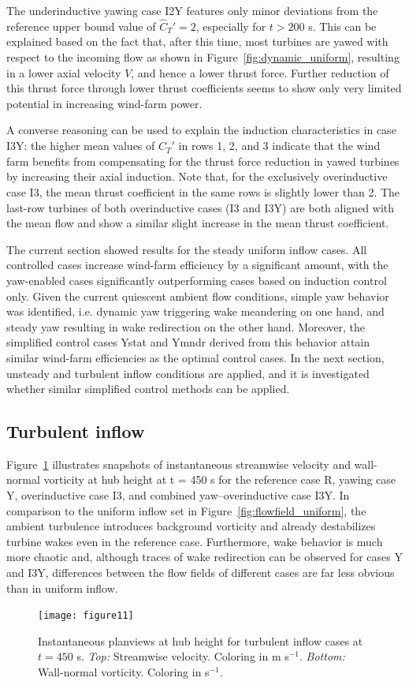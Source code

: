 \documentclass[energies,article,submit,moreauthors,latex,10pt,a4paper]{mdpi}
\newcommand{\cthat}{\widehat{C}_T'}
\begin{document}
The underinductive yawing case I2Y features only minor deviations from the reference upper bound value of $\cthat = 2$, especially for $t > 200$ s. This can be explained based on the fact that, after this time, most turbines are yawed with respect to the incoming flow as shown in Figure~\ref{fig:dynamic_uniform}, resulting in a lower axial velocity $V$, and hence a lower thrust force. Further reduction of this thrust force through lower thrust coefficients seems to show only very limited potential in increasing wind-farm power. 

A converse reasoning can be used to explain the induction characteristics in case I3Y: the higher mean values of $\cthat$ in rows 1, 2, and 3 indicate that the wind farm benefits from compensating for the thrust force reduction in yawed turbines by increasing their axial induction. Note that, for the exclusively overinductive case I3, the mean thrust coefficient in the same rows is slightly lower than 2. The last-row turbines of both overinductive cases (I3 and I3Y) are both aligned with the mean flow and show a similar slight increase in the mean thrust coefficient. 

The current section showed results for the steady uniform inflow cases. All controlled cases increase wind-farm efficiency by a significant amount, with the yaw-enabled cases significantly outperforming cases based on induction control only. Given the current quiescent ambient flow conditions, simple yaw behavior was identified, i.e. dynamic yaw triggering wake meandering on one hand, and steady yaw resulting in wake redirection on the other hand. Moreover, the simplified control cases Ystat and Ymndr derived from this behavior attain similar wind-farm efficiencies as the optimal control cases. In the next section, unsteady and turbulent inflow conditions are applied, and it is investigated whether similar simplified control methods can be applied.

\subsection{Turbulent inflow}\label{sec:opt_yaw_turb}
\noindent Figure~\ref{fig:flowfield_turb} illustrates snapshots of instantaneous streamwise velocity and wall-normal vorticity at hub height at t = 450 s for the reference case R, yawing case Y, overinductive case I3, and combined yaw--overinductive case I3Y. In comparison to the uniform inflow set in Figure~\ref{fig:flowfield_uniform}, the ambient turbulence introduces background vorticity and already destabilizes turbine wakes even in the reference case. Furthermore, wake behavior is much more chaotic and, although traces of wake redirection can be observed for cases Y and I3Y, differences between the flow fields of different cases are far less obvious than in uniform inflow. 
\begin{figure}
	\texttt{[image: figure11]}
	\caption{Instantaneous planviews at hub height for turbulent inflow cases at $t= 450$ s. \emph{Top: } Streamwise velocity. Coloring in m s$^{-1}$. \emph{Bottom: } Wall-normal vorticity. Coloring in s$^{-1}$. \label{fig:flowfield_turb}}
\end{figure}
\end{document}
